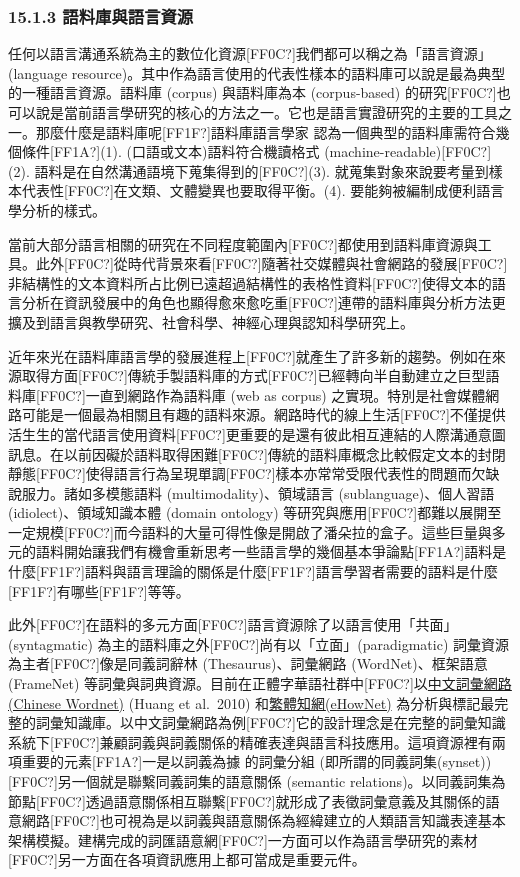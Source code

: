 \subsubsection{15.1.3 語料庫與語言資源}

任何以語言溝通系統為主的數位化資源[FF0C?]我們都可以稱之為「語言資源」(language resource)。其中作為語言使用的代表性樣本的語料庫可以說是最為典型的一種語言資源。語料庫 (corpus) 與語料庫為本 (corpus-based) 的研究[FF0C?]也可以說是當前語言學研究的核心的方法之一。它也是語言實證研究的主要的工具之一。那麼什麼是語料庫呢[FF1F?]語料庫語言學家 \citet{Gries2019} 認為一個典型的語料庫需符合幾個條件[FF1A?](1). (口語或文本)語料符合機讀格式 (machine-readable)[FF0C?](2). 語料是在自然溝通語境下蒐集得到的[FF0C?](3). 就蒐集對象來說要考量到樣本代表性[FF0C?]在文類、文體變異也要取得平衡。(4). 要能夠被編制成便利語言學分析的樣式。

當前大部分語言相關的研究在不同程度範圍內[FF0C?]都使用到語料庫資源與工具。此外[FF0C?]從時代背景來看[FF0C?]隨著社交媒體與社會網路的發展[FF0C?]非結構性的文本資料所占比例已遠超過結構性的表格性資料[FF0C?]使得文本的語言分析在資訊發展中的角色也顯得愈來愈吃重[FF0C?]連帶的語料庫與分析方法更擴及到語言與教學研究、社會科學、神經心理與認知科學研究上。

近年來光在語料庫語言學的發展進程上[FF0C?]就產生了許多新的趨勢。例如在來源取得方面[FF0C?]傳統手製語料庫的方式[FF0C?]已經轉向半自動建立之巨型語料庫[FF0C?]一直到網路作為語料庫 (web as corpus) 之實現。特別是社會媒體網路可能是一個最為相關且有趣的語料來源。網路時代的線上生活[FF0C?]不僅提供活生生的當代語言使用資料[FF0C?]更重要的是還有彼此相互連結的人際溝通意圖訊息。在以前因礙於語料取得困難[FF0C?]傳統的語料庫概念比較假定文本的封閉靜態[FF0C?]使得語言行為呈現單調[FF0C?]樣本亦常常受限代表性的問題而欠缺說服力。諸如多模態語料 (multimodality)、領域語言 (sublanguage)、個人習語 (idiolect)、領域知識本體 (domain ontology) 等研究與應用[FF0C?]都難以展開至一定規模[FF0C?]而今語料的大量可得性像是開啟了潘朵拉的盒子。這些巨量與多元的語料開始讓我們有機會重新思考一些語言學的幾個基本爭論點[FF1A?]語料是什麼[FF1F?]語料與語言理論的關係是什麼[FF1F?]語言學習者需要的語料是什麼[FF1F?]有哪些[FF1F?]等等。

此外[FF0C?]在語料的多元方面[FF0C?]語言資源除了以語言使用「共面」(syntagmatic) 為主的語料庫之外[FF0C?]尚有以「立面」(paradigmatic) 詞彙資源為主者[FF0C?]像是同義詞辭林 (Thesaurus)、詞彙網路 (WordNet)、框架語意 (FrameNet) 等詞彙與詞典資源。目前在正體字華語社群中[FF0C?]以\href{https://lope.linguistics.ntu.edu.tw/cwn2/}{中文詞彙網路}\href{https://lope.linguistics.ntu.edu.tw/cwn2/}{ (Chinese Wordnet)} (Huang et al.~2010) 和\href{http://ehownet.iis.sinica.edu.tw/}{繁體知網}\href{http://ehownet.iis.sinica.edu.tw/}{(eHowNet)} 為分析與標記最完整的詞彙知識庫。以中文詞彙網路為例[FF0C?]它的設計理念是在完整的詞彙知識系統下[FF0C?]兼顧詞義與詞義關係的精確表達與語言科技應用。這項資源裡有兩項重要的元素[FF1A?]一是以詞義為據 的詞彙分組 (即所謂的同義詞集(synset))[FF0C?]另一個就是聯繫同義詞集的語意關係 (semantic relations)。以同義詞集為節點[FF0C?]透過語意關係相互聯繫[FF0C?]就形成了表徵詞彙意義及其關係的語意網路[FF0C?]也可視為是以詞義與語意關係為經緯建立的人類語言知識表達基本架構模擬。建構完成的詞匯語意網[FF0C?]一方面可以作為語言學研究的素材[FF0C?]另一方面在各項資訊應用上都可當成是重要元件。

